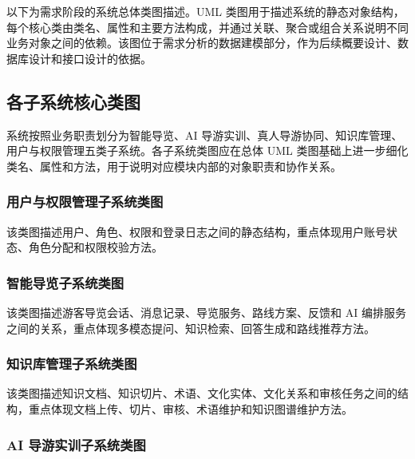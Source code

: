以下为需求阶段的系统总体类图描述。UML 类图用于描述系统的静态对象结构，每个核心类由类名、属性和主要方法构成，并通过关联、聚合或组合关系说明不同业务对象之间的依赖。该图位于需求分析的数据建模部分，作为后续概要设计、数据库设计和接口设计的依据。


\subsection{各子系统核心类图}

系统按照业务职责划分为智能导览、AI 导游实训、真人导游协同、知识库管理、用户与权限管理五类子系统。各子系统类图应在总体 UML 类图基础上进一步细化类名、属性和方法，用于说明对应模块内部的对象职责和协作关系。

\subsubsection{用户与权限管理子系统类图}

该类图描述用户、角色、权限和登录日志之间的静态结构，重点体现用户账号状态、角色分配和权限校验方法。


\subsubsection{智能导览子系统类图}

该类图描述游客导览会话、消息记录、导览服务、路线方案、反馈和 AI 编排服务之间的关系，重点体现多模态提问、知识检索、回答生成和路线推荐方法。


\subsubsection{知识库管理子系统类图}

该类图描述知识文档、知识切片、术语、文化实体、文化关系和审核任务之间的结构，重点体现文档上传、切片、审核、术语维护和知识图谱维护方法。


\subsubsection{AI 导游实训子系统类图}

